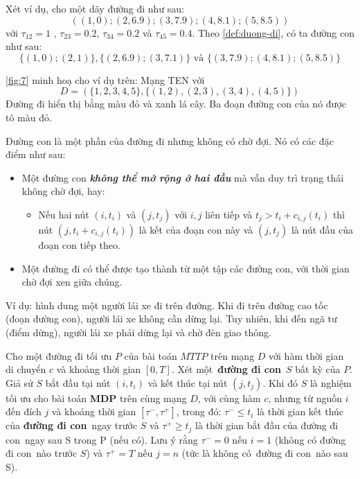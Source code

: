 \documentclass[../main.tex]{subfiles}
\begin{document}
Xét ví dụ, cho một dãy đường đi như sau:
\[((1,0);(2,6.9);(3,7.9);(4,8.1);(5,8.5))\] với \(\tau_{12} = 1\) ,
\(\tau_{23} = 0.2\), \(\tau_{34} = 0.2\) và \(\tau_{45} = 0.4\). Theo
\autoref{def:duong-di}, có ta đường con như sau: \[\{(1, 0); (2, 1)\}, \{(2, 6.9); (3, 7.1)\} \text{ và } \{(3, 7.9); (4, 8.1); (5, 8.5)\}\] 

\autoref{fig:7} minh hoạ cho ví dụ trên: Mạng TEN với
\[D = (\{1, 2, 3, 4, 5\}, \{(1, 2), (2, 3), (3, 4), (4, 5)\})\] 
Đường đi hiển thị bằng màu đỏ và xanh lá cây. 
Ba đoạn đường con của nó được tô màu đỏ.

Đường con là một phần của đường đi nhưng không có chờ đợi. Nó có các đặc
điểm như sau:

\begin{itemize}
\tightlist
\item
  Một đường con \textbf{\emph{không thể mở rộng ở hai đầu}} mà vẫn duy
  trì trạng thái không chờ đợi, hay:

  \begin{itemize}
  \tightlist
  \item
    Nếu hai nút \((i, t_i)\) và \((j, t_j)\) với \(i, j\) liên tiếp và
    \(t_j > t_i+c_{i,j}(t_i)\) thì nút \((j,t_i + c_{i,j}(t_i))\) là kết
    của đoạn con này và \((j, t_j)\) là nút đầu của đoạn con tiếp theo.
  \end{itemize}
\item
  Một đường đi có thể được tạo thành từ một tập các đường con, với thời
  gian chờ đợi xen giữa chúng.
\end{itemize}

Ví dụ: hình dung một người lái xe đi trên đường. Khi đi trên đường cao
tốc (đoạn đường con), người lái xe không cần dừng lại. Tuy nhiên, khi
đến ngã tư (điểm dừng), người lái xe phải dừng lại và chờ đèn giao
thông.

\begin{lemma}
\label{lem:toi-uu}
Cho một đường đi tối ưu
\(P\) của bài toán \(MTTP\) trên mạng \(D\) với hàm thời gian di chuyển
\(c\) và khoảng thời gian \([0,T]\). Xét một~\textbf{đường đi con}~\(S\)
bất kỳ của \(P\). Giả sử \(S\) bắt đầu tại nút \((i,t_i)\) và kết thúc
tại nút \((j,t_j)\). Khi đó \(S\) là nghiệm tối ưu cho bài toán
\textbf{MDP} trên cùng mạng \(D\), với cùng hàm \(c\), nhưng từ nguồn
\(i\) đến đích \(j\) và khoảng thời gian \([\tau^−,\tau^+]\), trong đó:
\(\tau^− \le t_i\) là thời gian kết thúc của \textbf{đường đi con}~ngay
trước \(S\) và \(\tau^+ \ge t_j\) là thời gian bắt đầu của đường đi
con~ngay sau S trong P (nếu có). Lưu ý rằng \(\tau^− = 0\) nếu \(i = 1\)
(không có đường đi con~nào trước \(S\)) và \(\tau^+ = T\) nếu \(j = n\)
(tức là không có~đường đi con~nào sau S).
\end{lemma}
\end{document}
